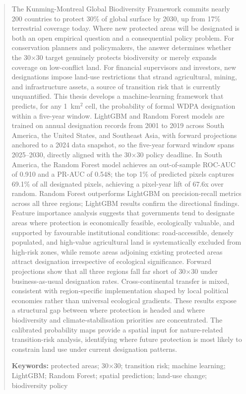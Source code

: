 \documentclass[12pt]{article}
\providecommand{\keywords}[1]{\textbf{Keywords:} #1}
\theoremstyle{break}
\begin{document}
\singlespacing
\begin{abstract}
\noindent
The Kunming-Montreal Global Biodiversity Framework commits nearly 200 countries to
protect 30\% of global surface by 2030, up from 17\% terrestrial coverage today. Where new protected
areas will be designated is both an open empirical question and a consequential
policy problem. For conservation planners and policymakers, the answer determines whether the
30$\times$30 target genuinely protects biodiversity or merely expands coverage on
low-conflict land. For financial supervisors and investors, new designations impose
land-use restrictions that strand agricultural, mining, and infrastructure assets,
a source of transition risk that is currently unquantified. This thesis develops a
machine-learning framework that predicts, for any 1~km$^2$ cell, the probability of
formal WDPA designation within a five-year window. LightGBM and Random Forest models
are trained on annual designation records from 2001 to 2019 across South America,
the United States, and Southeast Asia, with forward projections anchored to a 2024
data snapshot, so the five-year forward window spans 2025--2030, directly aligned with the 30$\times$30 policy deadline.
In South America, the Random Forest model achieves an out-of-sample
ROC-AUC of 0.910 and a PR-AUC of 0.548; the top 1\% of predicted pixels captures
69.1\% of all designated pixels, achieving a pixel-year lift of 67.6x over random. Random Forest outperforms
LightGBM on precision-recall metrics across all three regions; LightGBM results
confirm the directional findings. Feature importance analysis suggests that governments tend to designate areas
where protection is economically feasible, ecologically valuable,
and supported by favourable institutional conditions: road-accessible, densely populated, and
high-value agricultural land is systematically excluded from high-risk zones,
while remote areas adjoining existing protected areas attract designation
irrespective of ecological significance. Forward projections show that all three regions fall far
short of 30$\times$30 under business-as-usual designation rates. Cross-continental
transfer is mixed, consistent with region-specific implementation shaped by local
political economies rather than universal ecological gradients. These
results expose a structural gap between where protection is headed and where
biodiversity and climate-stabilisation priorities are concentrated. The calibrated
probability maps provide a spatial input for nature-related transition-risk analysis, 
identifying where future protection is most likely
to constrain land use under current designation patterns.

\medskip
\noindent\keywords{protected areas; 30$\times$30; transition risk; machine learning;
LightGBM; Random Forest; spatial prediction; land-use change; biodiversity policy}
\end{abstract}
\onehalfspacing
\end{document}
